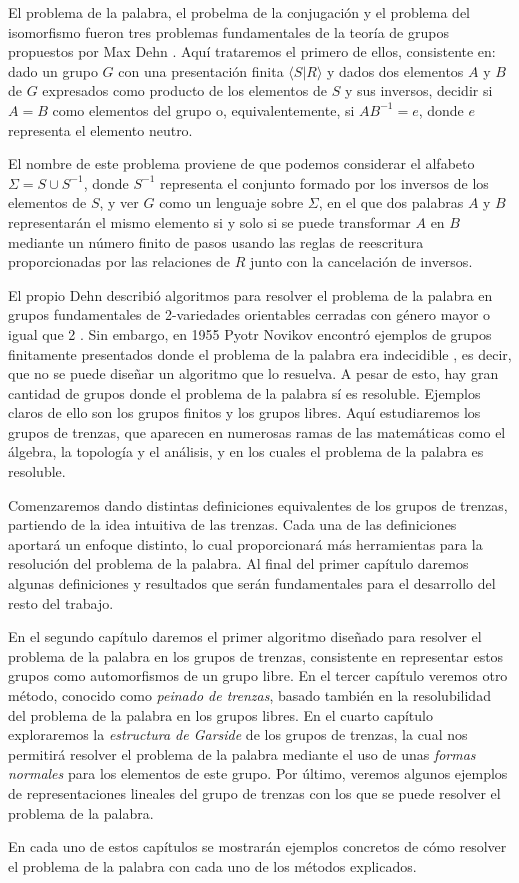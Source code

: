\documentclass[TFG.tex]{subfiles}
\begin{document}

El problema de la palabra, el probelma de la conjugación y el problema del isomorfismo fueron tres problemas fundamentales de la teoría de grupos propuestos por Max Dehn \cite{Dehn11}. Aquí trataremos el primero de ellos, consistente en: dado un grupo $G$ con una presentación finita $\langle S| R\rangle$ y dados dos elementos $A$ y $B$ de $G$ expresados como producto de los elementos de $S$ y sus inversos, decidir si $A=B$ como elementos del grupo o, equivalentemente, si $AB^{-1}=e$, donde $e$ representa el elemento neutro.

El nombre de este problema proviene de que podemos considerar el alfabeto $\Sigma=S\cup S^{-1}$, donde $S^{-1}$ representa el conjunto formado por los inversos de los elementos de $S$, y ver $G$ como un lenguaje sobre $\Sigma$, en el que dos palabras $A$ y $B$ representarán el mismo elemento si y solo si se puede transformar $A$ en $B$ mediante un número finito de pasos usando las reglas de reescritura proporcionadas por las relaciones de $R$ junto con la cancelación de inversos.  

El propio Dehn describió algoritmos para resolver el problema de la palabra en grupos fundamentales de 2-variedades orientables cerradas con género mayor o igual que 2 \cite{Dehn12}. Sin embargo, en 1955 Pyotr Novikov encontró ejemplos de grupos finitamente presentados donde el problema de la palabra era indecidible \cite{Novikov}, es decir, que no se puede diseñar un algoritmo que lo resuelva. A pesar de esto, hay gran cantidad de grupos donde el problema de la palabra sí es resoluble. Ejemplos claros de ello son los grupos finitos y los grupos libres. Aquí estudiaremos los grupos de trenzas, que aparecen en numerosas ramas de las matemáticas como el álgebra, la topología y el análisis, y en los cuales el problema de la palabra es resoluble.

Comenzaremos dando distintas definiciones equivalentes de los grupos de trenzas, partiendo de la idea intuitiva de las trenzas. Cada una de las definiciones aportará un enfoque distinto, lo cual proporcionará más herramientas para la resolución del problema de la palabra. Al final del primer capítulo daremos algunas definiciones y resultados que serán fundamentales para el desarrollo del resto del trabajo. 

En el segundo capítulo daremos el primer algoritmo diseñado para resolver el problema de la palabra en los grupos de trenzas, consistente en representar estos grupos como automorfismos de un grupo libre. En el tercer capítulo veremos otro método, conocido como \emph{peinado de trenzas}, basado también en la resolubilidad del problema de la palabra en los grupos libres. En el cuarto capítulo exploraremos la \emph{estructura de Garside} de los grupos de trenzas, la cual nos permitirá resolver el problema de la palabra mediante el uso de unas \emph{formas normales} para los elementos de este grupo. Por último, veremos algunos ejemplos de representaciones lineales del grupo de trenzas con los que se puede resolver el problema de la palabra. 

En cada uno de estos capítulos se mostrarán ejemplos concretos de cómo resolver el problema de la palabra con cada uno de los métodos explicados. 
\end{document}
